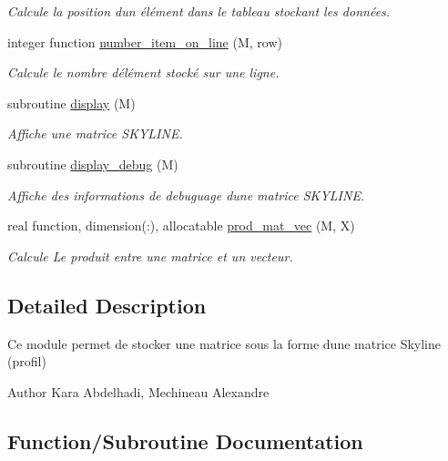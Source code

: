 \begin{DoxyCompactItemize}
\begin{DoxyCompactList}\small\item\em Calcule la position d\textquotesingle{}un élément dans le tableau stockant les données. \end{DoxyCompactList}\item 
integer function \hyperlink{namespaceskyline_a9f07218be321c12bea1d84f6b629e346}{number\+\_\+item\+\_\+on\+\_\+line} (M, row)
\begin{DoxyCompactList}\small\item\em Calcule le nombre d\textquotesingle{}élément stocké sur une ligne. \end{DoxyCompactList}\item 
subroutine \hyperlink{namespaceskyline_a428818245223fbf6e3a5a2264f8f1a65}{display} (M)
\begin{DoxyCompactList}\small\item\em Affiche une matrice S\+K\+Y\+L\+I\+NE. \end{DoxyCompactList}\item 
subroutine \hyperlink{namespaceskyline_aedb0d55aecd5f4cae4dc3593a5e89f0f}{display\+\_\+debug} (M)
\begin{DoxyCompactList}\small\item\em Affiche des informations de debuguage d\textquotesingle{}une matrice S\+K\+Y\+L\+I\+NE. \end{DoxyCompactList}\item 
real function, dimension(\+:), allocatable \hyperlink{namespaceskyline_ae156a973c4a30bd2740af6ef2fdfa1d9}{prod\+\_\+mat\+\_\+vec} (M, X)
\begin{DoxyCompactList}\small\item\em Calcule Le produit entre une matrice et un vecteur. \end{DoxyCompactList}\end{DoxyCompactItemize}


\subsection{Detailed Description}
Ce module permet de stocker une matrice sous la forme d\textquotesingle{}une matrice Skyline (profil) 

\begin{DoxyAuthor}{Author}
Kara Abdelhadi, Mechineau Alexandre 
\end{DoxyAuthor}


\subsection{Function/\+Subroutine Documentation}
\mbox{\label{namespaceskyline_a5fe1d351df2e3a07f96028d1d2a892a8}} 
